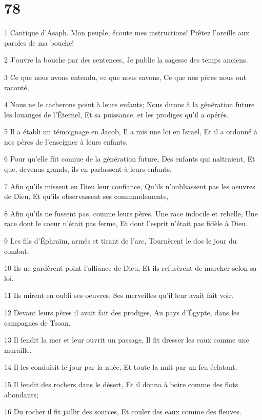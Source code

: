 \chapter{78}

\par 1 Cantique d'Asaph. Mon peuple, écoute mes instructions! Prêtez l'oreille aux paroles de ma bouche!
\par 2 J'ouvre la bouche par des sentences, Je publie la sagesse des temps anciens.
\par 3 Ce que nous avons entendu, ce que nous savons, Ce que nos pères nous ont raconté,
\par 4 Nous ne le cacherons point à leurs enfants; Nous dirons à la génération future les louanges de l'Éternel, Et sa puissance, et les prodiges qu'il a opérés.
\par 5 Il a établi un témoignage en Jacob, Il a mis une loi en Israël, Et il a ordonné à nos pères de l'enseigner à leurs enfants,
\par 6 Pour qu'elle fût connue de la génération future, Des enfants qui naîtraient, Et que, devenus grands, ils en parlassent à leurs enfants,
\par 7 Afin qu'ils missent en Dieu leur confiance, Qu'ils n'oubliassent pas les oeuvres de Dieu, Et qu'ils observassent ses commandements,
\par 8 Afin qu'ils ne fussent pas, comme leurs pères, Une race indocile et rebelle, Une race dont le coeur n'était pas ferme, Et dont l'esprit n'était pas fidèle à Dieu.
\par 9 Les fils d'Éphraïm, armés et tirant de l'arc, Tournèrent le dos le jour du combat.
\par 10 Ils ne gardèrent point l'alliance de Dieu, Et ils refusèrent de marcher selon sa loi.
\par 11 Ils mirent en oubli ses oeuvres, Ses merveilles qu'il leur avait fait voir.
\par 12 Devant leurs pères il avait fait des prodiges, Au pays d'Égypte, dans les campagnes de Tsoan.
\par 13 Il fendit la mer et leur ouvrit un passage, Il fit dresser les eaux comme une muraille.
\par 14 Il les conduisit le jour par la nuée, Et toute la nuit par un feu éclatant.
\par 15 Il fendit des rochers dans le désert, Et il donna à boire comme des flots abondants;
\par 16 Du rocher il fit jaillir des sources, Et couler des eaux comme des fleuves.
